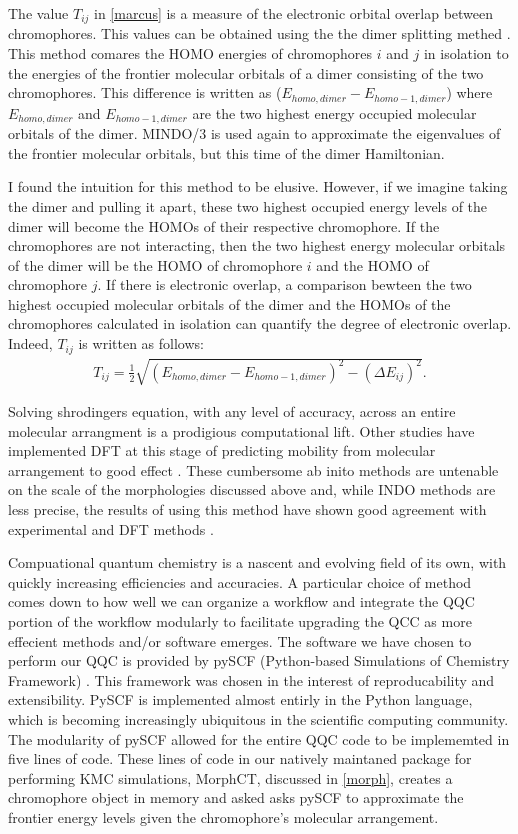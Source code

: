 The value $T_{ij}$ in \autoref{marcus} is a measure of the electronic orbital overlap between chromophores.
This values can be obtained using the
the dimer splitting methed \cite{Huang2005b}. This method comares the HOMO energies of chromophores $i$ and
$j$ in isolation to the energies of the frontier molecular orbitals of a dimer
consisting of the two chromophores. 
This difference is written as ($E_{homo,dimer} - E_{homo-1,dimer}$) where $E_{homo,dimer}$ 
and $E_{homo-1,dimer}$ are the two highest energy occupied molecular orbitals of the dimer. MINDO/3 is used
again to approximate the eigenvalues of the frontier molecular orbitals, but this time of the dimer
Hamiltonian. 

I found the intuition for this method to be elusive. However, if we imagine
taking the dimer and pulling it apart, these two highest occupied energy levels of the dimer 
will become the HOMOs of their respective chromophore. If the chromophores are not interacting, 
then the two highest energy molecular orbitals of the dimer will be the HOMO of chromophore $i$ and the 
HOMO of chromophore $j$. If there is electronic overlap, a comparison bewteen the two highest occupied
molecular orbitals of the dimer and the HOMOs of the chromophores calculated in isolation can quantify the degree of
electronic overlap. Indeed, $T_{ij}$ is written as follows:
\begin{align}
    T_{ij} = \frac{1}{2}\sqrt{ (E_{homo,dimer} - E_{homo-1,dimer})^{2} - (\Delta E_{ij})^{2} }.
\end{align}
 

Solving shrodingers equation, with any level of accuracy,
across an entire molecular arrangment is a prodigious computational lift.
Other studies have implemented DFT at this stage of predicting
mobility from molecular arrangement to good effect \cite{Deng2004}. These cumbersome ab inito methods are
untenable on the scale of the morphologies discussed above and, while INDO methods are less precise, the results
of using this method have shown good agreement with experimental and DFT methods \cite{Bredas2002}. 

Compuational quantum chemistry is a nascent and evolving field of its
own, with quickly increasing efficiencies and accuracies.
A particular 
choice of method comes down to how well we can organize a workflow and integrate the QQC portion of the
workflow modularly to facilitate upgrading the QCC as more effecient methods and/or software emerges.
The software we have chosen to perform our QQC is
provided by pySCF (Python-based Simulations of Chemistry Framework) \cite{Sun2018a}. This framework
was chosen in the interest of reproducability and extensibility.
PySCF is implemented almost entirly in the Python 
language, which is becoming increasingly ubiquitous in the scientific computing community. The modularity of
pySCF allowed for the entire QQC code to be implememted in five lines of code. These lines of code in 
our natively maintaned package
for performing KMC simulations, MorphCT, discussed in
\autoref{morph}, creates a chromophore object in memory and asked asks pySCF to approximate the frontier
energy levels given the chromophore's molecular arrangement.  

